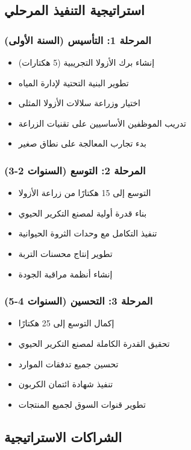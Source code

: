 \subsection{استراتيجية التنفيذ المرحلي}

\subsubsection{المرحلة 1: التأسيس (السنة الأولى)}
\begin{itemize}
    \item إنشاء برك الأزولا التجريبية (5 هكتارات)
    \item تطوير البنية التحتية لإدارة المياه
    \item اختيار وزراعة سلالات الأزولا المثلى
    \item تدريب الموظفين الأساسيين على تقنيات الزراعة
    \item بدء تجارب المعالجة على نطاق صغير
\end{itemize}

\subsubsection{المرحلة 2: التوسع (السنوات 2-3)}
\begin{itemize}
    \item التوسع إلى 15 هكتارًا من زراعة الأزولا
    \item بناء قدرة أولية لمصنع التكرير الحيوي
    \item تنفيذ التكامل مع وحدات الثروة الحيوانية
    \item تطوير إنتاج محسنات التربة
    \item إنشاء أنظمة مراقبة الجودة
\end{itemize}

\subsubsection{المرحلة 3: التحسين (السنوات 4-5)}
\begin{itemize}
    \item إكمال التوسع إلى 25 هكتارًا
    \item تحقيق القدرة الكاملة لمصنع التكرير الحيوي
    \item تحسين جميع تدفقات الموارد
    \item تنفيذ شهادة ائتمان الكربون
    \item تطوير قنوات السوق لجميع المنتجات
\end{itemize}

\subsection{الشراكات الاستراتيجية}

